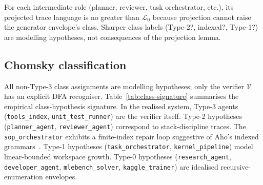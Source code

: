 \begin{theorem}
\label{thm:derived}
For each intermediate role (planner, reviewer, task orchestrator,
etc.), its projected trace language is no greater than $\mathcal{L}_0$
because projection cannot raise the generator envelope's class.
Sharper class labels (Type-2?, indexed?, Type-1?) are modelling
hypotheses, not consequences of the projection lemma.
\end{theorem}

\subsection{Chomsky classification}

All non-Type-3 class assignments are modelling hypotheses; only the
verifier $\mathcal{V}$ has an explicit DFA recogniser.
Table~\ref{tab:class-signature} summarises the empirical
class-hypothesis signature.  In the realised system, Type-3 agents
(\texttt{tools\_index}, \texttt{unit\_test\_runner}) are the
verifier itself.  Type-2 hypotheses (\texttt{planner\_agent},
\texttt{reviewer\_agent}) correspond to stack-discipline traces.
The \texttt{sop\_orchestrator} exhibits a finite-index repair loop
suggestive of Aho's indexed grammars~\cite{aho1968indexed}.
Type-1 hypotheses (\texttt{task\_orchestrator},
\texttt{kernel\_pipeline}) model linear-bounded workspace growth.
Type-0 hypotheses (\texttt{research\_agent},
\texttt{developer\_agent}, \texttt{mlebench\_solver},
\texttt{kaggle\_trainer}) are idealised recursive-enumeration
envelopes.

\begin{table}[ht]
\centering
\caption{Empirical class-hypothesis signature.}
\label{tab:class-signature}
\end{table}

